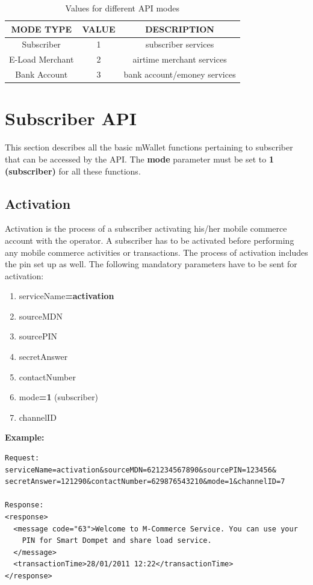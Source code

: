 \documentclass[11pt,titlepage]{article}
\begin{document}
\begin{table}[h]
\centering
\begin{tabular}{|c|c|c|}
\hline
MODE TYPE & VALUE & DESCRIPTION\\
\hline
\hline
Subscriber & 1 & subscriber services\\
\hline
E-Load Merchant & 2 & airtime merchant services\\
\hline
Bank Account & 3 & bank account/emoney services\\
\hline
\end{tabular}
\label{mode-table}
\caption{Values for different API modes}
\end{table}

\pagebreak[4]
\section{Subscriber API}
This section describes all the basic mWallet functions pertaining to subscriber that can be accessed by the API. The {\bf mode} parameter must be set to {\bf 1 (subscriber)} for all these functions.
\subsection{Activation}
Activation is the process of a subscriber activating his/her mobile commerce account with the operator. A subscriber has to be activated before performing any mobile commerce activities or transactions. The process of activation includes the pin set up as well. 
The following mandatory parameters have to be sent for activation:
\begin{enumerate}
\item serviceName\textbf{=activation}
\item sourceMDN
\item sourcePIN
\item secretAnswer
\item contactNumber
\item mode\textbf{=1} (subscriber)
\item channelID
\end{enumerate}
\textbf{Example:}
\begin{verbatim}
Request:
serviceName=activation&sourceMDN=621234567890&sourcePIN=123456&
secretAnswer=121290&contactNumber=629876543210&mode=1&channelID=7

Response:
<response>
  <message code="63">Welcome to M-Commerce Service. You can use your
    PIN for Smart Dompet and share load service.
  </message>
  <transactionTime>28/01/2011 12:22</transactionTime>
</response>
\end{verbatim}
\end{document}
